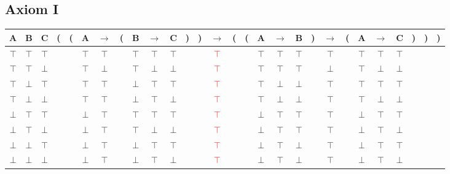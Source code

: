 \documentclass{article}
\begin{document}
\subsection{Axiom I}
\begin{tabular}{@{ }c@{ }@{ }c@{ }@{ }c | c@{}@{}c@{}@{ }c@{ }@{ }c@{ }@{}c@{}@{ }c@{ }@{ }c@{ }@{ }c@{ }@{}c@{}@{}c@{}@{ }c@{ }@{}c@{}@{}c@{}@{ }c@{ }@{ }c@{ }@{ }c@{ }@{}c@{}@{ }c@{ }@{}c@{}@{ }c@{ }@{ }c@{ }@{ }c@{ }@{}c@{}@{}c@{}@{}c@{ }}
A & B & C & ( & ( & A & $\rightarrow$ & ( & B & $\rightarrow$ & C & ) & ) & $\rightarrow$ & ( & ( & A & $\rightarrow$ & B & ) & $\rightarrow$ & ( & A & $\rightarrow$ & C & ) & ) & )\\
\hline 
$\top$ & $\top$ & $\top$ &  &  & $\top$ & $\top$ &  & $\top$ & $\top$ & $\top$ &  &  & \textcolor{red}{$\top$} &  &  & $\top$ & $\top$ & $\top$ &  & $\top$ &  & $\top$ & $\top$ & $\top$ &  &  & \\
$\top$ & $\top$ & $\bot$ &  &  & $\top$ & $\bot$ &  & $\top$ & $\bot$ & $\bot$ &  &  & \textcolor{red}{$\top$} &  &  & $\top$ & $\top$ & $\top$ &  & $\bot$ &  & $\top$ & $\bot$ & $\bot$ &  &  & \\
$\top$ & $\bot$ & $\top$ &  &  & $\top$ & $\top$ &  & $\bot$ & $\top$ & $\top$ &  &  & \textcolor{red}{$\top$} &  &  & $\top$ & $\bot$ & $\bot$ &  & $\top$ &  & $\top$ & $\top$ & $\top$ &  &  & \\
$\top$ & $\bot$ & $\bot$ &  &  & $\top$ & $\top$ &  & $\bot$ & $\top$ & $\bot$ &  &  & \textcolor{red}{$\top$} &  &  & $\top$ & $\bot$ & $\bot$ &  & $\top$ &  & $\top$ & $\bot$ & $\bot$ &  &  & \\
$\bot$ & $\top$ & $\top$ &  &  & $\bot$ & $\top$ &  & $\top$ & $\top$ & $\top$ &  &  & \textcolor{red}{$\top$} &  &  & $\bot$ & $\top$ & $\top$ &  & $\top$ &  & $\bot$ & $\top$ & $\top$ &  &  & \\
$\bot$ & $\top$ & $\bot$ &  &  & $\bot$ & $\top$ &  & $\top$ & $\bot$ & $\bot$ &  &  & \textcolor{red}{$\top$} &  &  & $\bot$ & $\top$ & $\top$ &  & $\top$ &  & $\bot$ & $\top$ & $\bot$ &  &  & \\
$\bot$ & $\bot$ & $\top$ &  &  & $\bot$ & $\top$ &  & $\bot$ & $\top$ & $\top$ &  &  & \textcolor{red}{$\top$} &  &  & $\bot$ & $\top$ & $\bot$ &  & $\top$ &  & $\bot$ & $\top$ & $\top$ &  &  & \\
$\bot$ & $\bot$ & $\bot$ &  &  & $\bot$ & $\top$ &  & $\bot$ & $\top$ & $\bot$ &  &  & \textcolor{red}{$\top$} &  &  & $\bot$ & $\top$ & $\bot$ &  & $\top$ &  & $\bot$ & $\top$ & $\bot$ &  &  & \\
\end{tabular}
\end{document}
